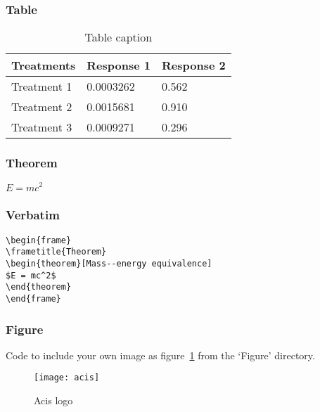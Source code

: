 \begin{frame}
\frametitle{Table}
\begin{table}
\begin{tabular}{l l l}
\toprule
\textbf{Treatments} & \textbf{Response 1} & \textbf{Response 2}\\
\midrule
Treatment 1 & 0.0003262 & 0.562 \\
Treatment 2 & 0.0015681 & 0.910 \\
Treatment 3 & 0.0009271 & 0.296 \\
\bottomrule
\end{tabular}
\caption{Table caption}
\end{table}
\end{frame}


\begin{frame}
\frametitle{Theorem}
\begin{theorem}
$E = mc^2$
\end{theorem}
\end{frame}


\begin{frame}[fragile] %
\frametitle{Verbatim}
\begin{example}
\begin{verbatim}
\begin{frame}
\frametitle{Theorem}
\begin{theorem}[Mass--energy equivalence]
$E = mc^2$
\end{theorem}
\end{frame}\end{verbatim}
\end{example}
\end{frame}


\begin{frame}
\frametitle{Figure}
Code to include your own image as figure~\ref{fig:acis} from the `Figure' directory.
\begin{figure}
\texttt{[image: acis]}
\caption{Acis logo}
\label{fig:acis}
\end{figure}
\end{frame}

